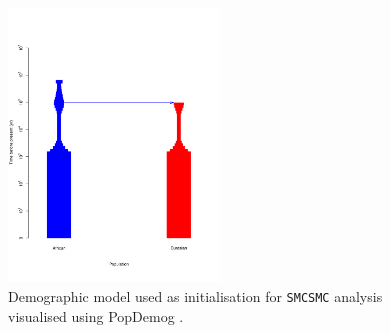 \documentclass{article}
\begin{document}
\begin{figure}[ht]
	\centering
	\includegraphics[width=0.5\textwidth]{plot/dem_smc2.pdf}
	\caption{Demographic model used as initialisation for {\tt SMCSMC} analysis visualised using PopDemog \cite{Zhou2018}.}
	\label{smc2demog}
\end{figure}
\newpage

\end{document}
